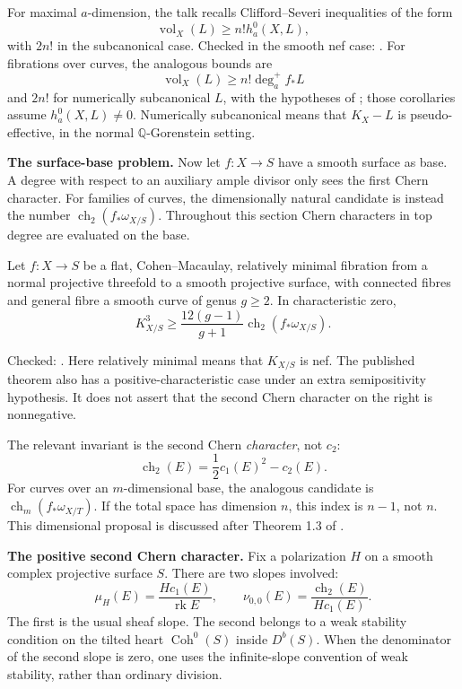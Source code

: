 For maximal $a$-dimension, the talk recalls
Clifford--Severi inequalities of the form
$$
\operatorname{vol}_X(L)
\geq n!h_a^0(X,L),
$$
with $2n!$ in the subcanonical case.
Checked in the smooth nef case:
\cite[Main Theorem]{barja-clifford-severi}.
For fibrations over curves, the analogous
bounds are
$$
\operatorname{vol}_X(L)
\geq n!\deg_a^+f_*L
$$
and $2n!$ for numerically subcanonical
$L$, with the hypotheses of
\cite[Corollaries 4.15 and 4.16]
{barja-irregular-slopes}; those corollaries
assume $h_a^0(X,L)\neq0$.
Numerically subcanonical means that
$K_X-L$ is pseudo-effective, in the
normal $\mathbb{Q}$-Gorenstein setting.

\medskip\noindent
{\bf The surface-base problem.}
Now let $f\colon X\to S$ have a smooth
surface as base. A degree with respect to
an auxiliary ample divisor only sees the
first Chern character. For families of
curves, the dimensionally natural candidate
is instead the number
$\operatorname{ch}_2(f_*\omega_{X/S})$.
Throughout this section Chern characters
in top degree are evaluated on the base.

\begin{theorem}[Zhang]
\label{theorem-barja-zhang}
Let $f\colon X\to S$ be a flat,
Cohen--Macaulay, relatively minimal
fibration from a normal projective
threefold to a smooth projective surface,
with connected fibres and general fibre
a smooth curve of genus $g\geq2$.
In characteristic zero,
$$
K_{X/S}^3\geq
\frac{12(g-1)}{g+1}
\operatorname{ch}_2(f_*\omega_{X/S}).
$$
\end{theorem}

Checked:
\cite[Definition 1.1 and Theorem 1.3]
{zhang-slope-surfaces}.
Here relatively minimal means that
$K_{X/S}$ is nef. The published theorem
also has a positive-characteristic case
under an extra semipositivity hypothesis.
It does not assert that the second Chern
character on the right is nonnegative.

\begin{remark}
\label{remark-barja-chern-character}
The relevant invariant is the second
Chern \emph{character}, not $c_2$:
$$
\operatorname{ch}_2(E)
=\frac12c_1(E)^2-c_2(E).
$$
For curves over an $m$-dimensional base,
the analogous candidate is
$\operatorname{ch}_m(f_*\omega_{X/T})$.
If the total space has dimension $n$, this
index is $n-1$, not $n$.
This dimensional proposal is discussed
after Theorem 1.3 of
\cite{zhang-slope-surfaces}.
\end{remark}

\medskip\noindent
{\bf The positive second Chern character.}
Fix a polarization $H$ on a smooth complex
projective surface $S$. There are two
slopes involved:
$$
\mu_H(E)=\frac{Hc_1(E)}
{\operatorname{rk}E},
\qquad
\nu_{0,0}(E)=
\frac{\operatorname{ch}_2(E)}{Hc_1(E)}.
$$
The first is the usual sheaf slope.
The second belongs to a weak stability
condition on the tilted heart
$\operatorname{Coh}^0(S)$ inside
$D^b(S)$. When the denominator of the
second slope is zero, one uses the
infinite-slope convention of weak
stability, rather than ordinary division.


